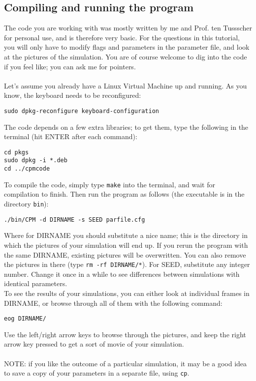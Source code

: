 \documentclass[a4paper,10pt]{article}
\begin{document}
\subsection*{Compiling and running the program}
The code you are working with was mostly written by me and Prof. ten Tussscher for personal use, and is therefore very basic. For the questions in this tutorial, you will only have to modify flags and parameters in the parameter file, and look at the pictures of the simulation.
You are of course welcome to dig into the code if you feel like; you can ask me for pointers.\\
\\
Let's assume you already have a Linux Virtual Machine up and running. As you know, the keyboard needs to be reconfigured:
\begin{verbatim}
sudo dpkg-reconfigure keyboard-configuration
\end{verbatim}
The code depends on a few extra libraries; to get them, type the following in 
the terminal (hit ENTER after each command):
\begin{verbatim}
cd pkgs
sudo dpkg -i *.deb
cd ../cpmcode  
\end{verbatim}
To compile the code, simply type \texttt{make} into the terminal, and wait for compilation to finish. Then run the program as follows (the executable is in the directory \texttt{bin}):
\begin{verbatim}
./bin/CPM -d DIRNAME -s SEED parfile.cfg
\end{verbatim}
Where for DIRNAME you should substitute a nice name; this is the directory in which the pictures of your simulation will end up. If you rerun the 
program with the same DIRNAME, existing pictures will be overwritten. You can also remove the pictures in there (type 
\texttt{rm -rf DIRNAME/*}). For SEED, substitute any integer number. Change it once in a while to see differences between 
simulations with identical parameters.\\ 
To see the results of your simulations, you can either look at individual frames in DIRNAME, or browse through all of them with the following 
command:
\begin{verbatim}
eog DIRNAME/
\end{verbatim}
Use the left/right arrow keys to browse through the pictures, and keep the right arrow key pressed to get a sort of movie of your simulation.\\
\\
NOTE: if you like the outcome of a particular simulation, it may be a good idea to save a copy of your parameters in a separate file, using 
\texttt{cp}.
\end{document}
